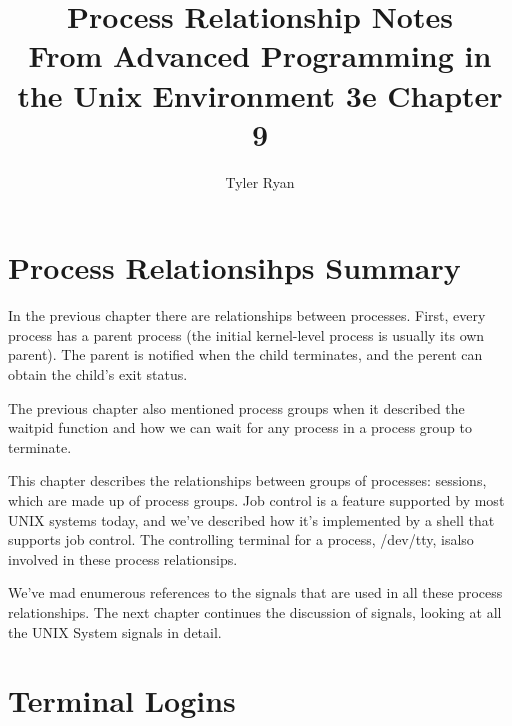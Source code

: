 \documentclass{article}
\author{Tyler Ryan}
\newcommand\book{Advanced Programming in the Unix Environment 3e}
\begin{document}
\title{Process Relationship Notes\\From \book{} Chapter 9}
\maketitle
\tableofcontents
\newpage



\section{Process Relationsihps Summary}
In the previous chapter there are relationships between processes. First, every 
process has a parent process (the initial kernel-level process is usually its 
own parent). The parent is notified when the child terminates, and the perent can 
obtain the child's exit status. 

The previous chapter also mentioned process groups when it described the waitpid 
function and how we can wait for any process in a process group to terminate.

This chapter describes the relationships between groups of processes: sessions, 
which are made up of process groups. Job control is a feature supported by most 
UNIX systems today, and we've described how it's implemented by a shell that 
supports job control. The controlling terminal for a process, /dev/tty, isalso 
involved in these process relationsips.

We've mad enumerous references to the signals that are used in all these process 
relationships. The next chapter continues the discussion of signals, looking at 
all the UNIX System signals in detail.

\section{Terminal Logins}
\end{document}
